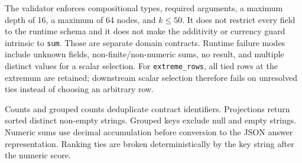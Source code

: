 The validator enforces compositional types, required arguments, a maximum depth of 16, a maximum
of 64 nodes, and $k\leq50$.  It does not restrict every field to the runtime schema and it does
not make the additivity or currency guard intrinsic to \texttt{sum}.  Those are separate domain
contracts.  Runtime failure modes include unknown fields, non-finite/non-numeric sums, no result,
and multiple distinct values for a scalar selection.  For \texttt{extreme\_rows}, all tied rows
at the extremum are retained; downstream scalar selection therefore fails on unresolved ties
instead of choosing an arbitrary row.

Counts and grouped counts deduplicate contract identifiers.  Projections return sorted distinct
non-empty strings.  Grouped keys exclude null and empty strings.  Numeric sums use decimal
accumulation before conversion to the JSON answer representation.  Ranking ties are broken
deterministically by the key string after the numeric score.
